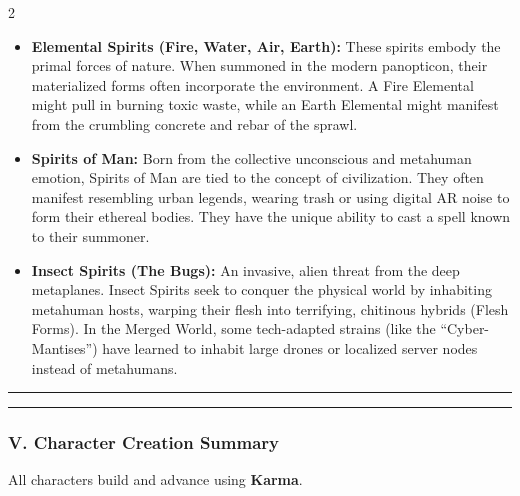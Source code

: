 \documentclass[
  oneside]{article}
\providecommand{\tightlist}{%
  \setlength{\itemsep}{0pt}\setlength{\parskip}{0pt}}
\begin{document}
\begin{multicols}{2}
\begin{itemize}
\tightlist
\item
  \textbf{Elemental Spirits (Fire, Water, Air,
  Earth):} These spirits embody the primal forces
  of nature. When summoned in the modern
  panopticon, their materialized forms often
  incorporate the environment. A Fire Elemental
  might pull in burning toxic waste, while an
  Earth Elemental might manifest from the
  crumbling concrete and rebar of the sprawl.
\item
  \textbf{Spirits of Man:} Born from the
  collective unconscious and metahuman emotion,
  Spirits of Man are tied to the concept of
  civilization. They often manifest resembling
  urban legends, wearing trash or using digital AR
  noise to form their ethereal bodies. They have
  the unique ability to cast a spell known to
  their summoner.
\item
  \textbf{Insect Spirits (The Bugs):} An invasive,
  alien threat from the deep metaplanes. Insect
  Spirits seek to conquer the physical world by
  inhabiting metahuman hosts, warping their flesh
  into terrifying, chitinous hybrids (Flesh
  Forms). In the Merged World, some tech-adapted
  strains (like the ``Cyber-Mantises'') have
  learned to inhabit large drones or localized
  server nodes instead of metahumans.
\end{itemize}

\begin{center}\rule{0.5\linewidth}{0.5pt}\end{center}

\begin{center}\rule{0.5\linewidth}{0.5pt}\end{center}

\hypertarget{v.-character-creation-summary}{%
\subsubsection{V. Character Creation
Summary}\label{v.-character-creation-summary}}

All characters build and advance using
\textbf{Karma}.

\end{multicols}
\end{document}
